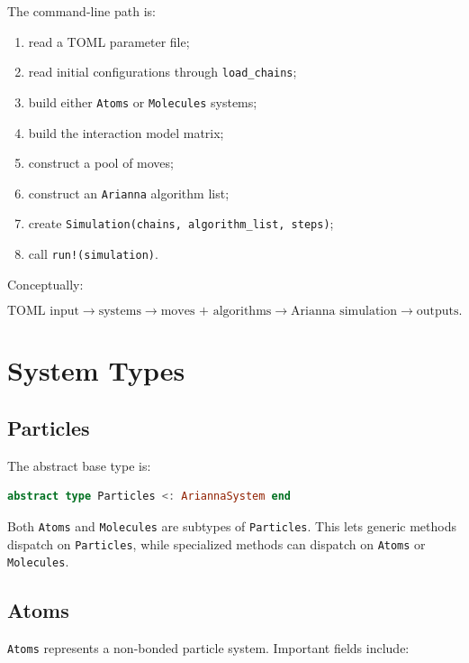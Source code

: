 \documentclass[11pt]{article}
\begin{document}
The command-line path is:

\begin{enumerate}[nosep]
  \item read a TOML parameter file;
  \item read initial configurations through \texttt{load\_chains};
  \item build either \texttt{Atoms} or \texttt{Molecules} systems;
  \item build the interaction model matrix;
  \item construct a pool of moves;
  \item construct an \texttt{Arianna} algorithm list;
  \item create \texttt{Simulation(chains, algorithm\_list, steps)};
  \item call \texttt{run!(simulation)}.
\end{enumerate}

Conceptually:

\[
\text{TOML input}
\rightarrow
\text{systems}
\rightarrow
\text{moves + algorithms}
\rightarrow
\text{Arianna simulation}
\rightarrow
\text{outputs}.
\]

\section{System Types}

\subsection{Particles}

The abstract base type is:

\begin{lstlisting}[language=Julia]
abstract type Particles <: AriannaSystem end
\end{lstlisting}

Both \texttt{Atoms} and \texttt{Molecules} are subtypes of \texttt{Particles}.
This lets generic methods dispatch on \texttt{Particles}, while specialized
methods can dispatch on \texttt{Atoms} or \texttt{Molecules}.

\subsection{Atoms}

\texttt{Atoms} represents a non-bonded particle system. Important fields include:
\end{document}
